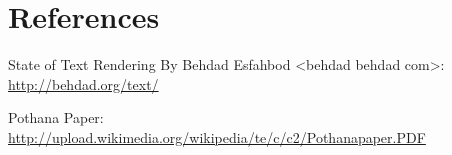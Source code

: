 \chapter{References}

State of Text Rendering By Behdad Esfahbod <behdad behdad com>: {\url{http://behdad.org/text/}}

Pothana Paper: {\url{http://upload.wikimedia.org/wikipedia/te/c/c2/Pothanapaper.PDF}}
